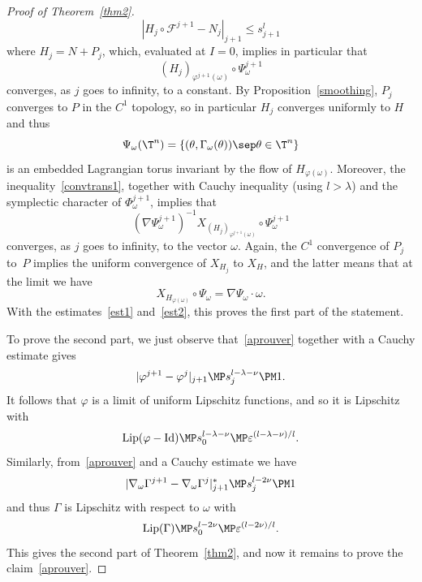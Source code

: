 \begin{proof}[Proof of Theorem~\ref{thm2}]
\begin{equation}\label{convtrans1}
|H_j \circ \mathcal{F}^{j+1}-N_j|_{j+1} \leq s_{j+1}^l
\end{equation}
where $H_j=N+P_j$, which, evaluated at $I=0$, implies in particular that
\[ (H_j)_{\varphi^{j+1}(\omega)} \circ \Psi_\omega^{j+1} \]
converges, as $j$ goes to infinity, to a constant. By Proposition~\ref{smoothing}, $P_j$ converges to $P$ in the $C^1$ topology, so in particular $H_j$ converges uniformly to $H$ and thus
\[ \Psi_\omega(\T^n)=\{(\theta,\Gamma_\omega(\theta)) \sep \theta \in \T^n\} \]
is an embedded Lagrangian torus invariant by the flow of $H_{\varphi(\omega)}$. Moreover, the inequality~\eqref{convtrans1}, together with Cauchy inequality (using $l>\lambda$) and the symplectic character of $\Phi_\omega^{j+1}$, implies that
\[ (\nabla \Psi_\omega^{j+1})^{-1}X_{(H_j)_{\varphi^{j+1}(\omega)}} \circ \Psi_\omega^{j+1} \]
converges, as $j$ goes to infinity, to the vector $\omega$. Again, the $C^1$ convergence of $P_j$ to~$P$ implies the uniform convergence of $X_{H_j}$ to $X_H$, and the latter means that at the limit we have
\[ X_{H_{\varphi(\omega)}} \circ \Psi_\omega=\nabla \Psi_\omega\cdot \omega. \]
With the estimates~\eqref{est1} and~\eqref{est2}, this proves the first part of the statement.

To prove the second part, we just observe that~\eqref{aprouver} together with a Cauchy estimate gives
\[ |\varphi^{j+1}-\varphi^j|_{j+1} \MP s_j^{l-\lambda-\nu} \PM 1. \]
It follows that $\varphi$ is a limit of uniform Lipschitz functions, and so it is Lipschitz with
\[ \mathrm{Lip}(\varphi-\mathrm{Id}) \MP s_0^{l-\lambda-\nu} \MP \varepsilon^{(l-\lambda-\nu)/l}. \]
Similarly, from~\eqref{aprouver} and a Cauchy estimate we have
\[ |\nabla_\omega\Gamma^{j+1} - \nabla _\omega \Gamma^j|_{j+1}^* \MP s_j^{l-2\nu} \PM 1\]
and thus $\Gamma$ is Lipschitz with respect to $\omega$ with
\[ \mathrm{Lip}(\Gamma) \MP s_0^{l-2\nu} \MP \varepsilon^{(l-2\nu)/l}.\]
This gives the second part of Theorem~\ref{thm2}, and now it remains to prove the claim~\eqref{aprouver}.


\end{proof}
